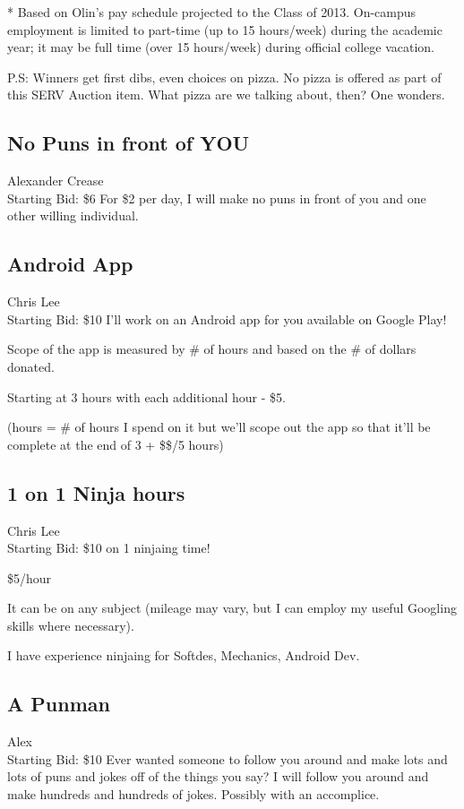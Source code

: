 \documentclass[11pt]{article}
\begin{document}
* Based on Olin's pay schedule projected to the Class of 2013. On-campus employment is limited to part-time (up to 15 hours/week) during the academic year; it may be full time (over 15 hours/week) during official college vacation.

P.S: Winners get first dibs, even choices on pizza. No pizza is offered as part of this SERV Auction item. What pizza are we talking about, then? One wonders.
\subsection{No Puns in front of YOU}
Alexander Crease
\\
Starting Bid: \$6
\newline
For \$2 per day, I will make no puns in front of you and one other willing individual.
\subsection{Android App}
Chris Lee
\\
Starting Bid: \$10
\newline
I'll work on an Android app for you available on Google Play!

Scope of the app is measured by \# of hours and based on the \# of dollars donated. 

Starting at 3 hours with each additional hour - \$5. 

(hours = \# of hours I spend on it but we'll scope out the app so that it'll be complete at the end of 3 + \$\$/5 hours)
\subsection{1 on 1 Ninja hours}
Chris Lee
\\
Starting Bid: \$10
 on 1 ninjaing time! 

\$5/hour

It can be on any subject (mileage may vary, but I can employ my useful Googling skills where necessary). 

I have experience ninjaing for Softdes, Mechanics, Android Dev.
\subsection{A Punman}
Alex
\\
Starting Bid: \$10
\newline
Ever wanted someone to follow you around and make lots and lots of puns and jokes off of the things you say? I will follow you around and make hundreds and hundreds of jokes. Possibly with an accomplice. 
\end{document}
